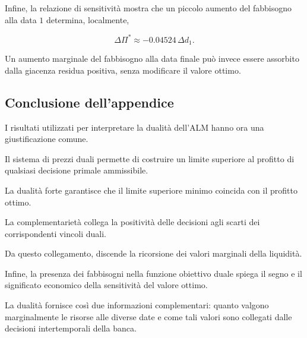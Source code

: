 Infine, la relazione di sensitivit\`{a}
mostra che un piccolo aumento
del fabbisogno alla data $1$ determina,
localmente,

\[
\Delta\Pi^*
\approx
-0.04524\,\Delta d_1.
\]

Un aumento marginale del fabbisogno
alla data finale pu\`{o} invece
essere assorbito dalla giacenza
residua positiva, senza modificare
il valore ottimo.

\subsection{Conclusione dell'appendice}

I risultati utilizzati per interpretare
la dualit\`{a} dell'ALM hanno ora
una giustificazione comune.

Il sistema di prezzi duali permette
di costruire un limite superiore al
profitto di qualsiasi decisione
primale ammissibile.

La dualit\`{a} forte garantisce che
il limite superiore minimo coincida
con il profitto ottimo.

La complementariet\`{a} collega
la positivit\`{a} delle decisioni
agli scarti dei corrispondenti
vincoli duali.

Da questo collegamento, discende
la ricorsione dei valori marginali
della liquidit\`{a}.

Infine, la presenza dei fabbisogni
nella funzione obiettivo duale
spiega il segno e il significato
economico della sensitivit\`{a}
del valore ottimo.

La dualit\`{a} fornisce cos\`{i}
due informazioni complementari:
quanto valgono marginalmente
le risorse alle diverse date
e come tali valori sono collegati
dalle decisioni intertemporali
della banca.
